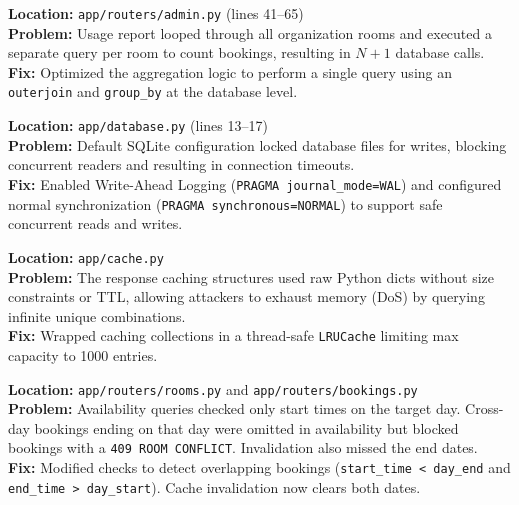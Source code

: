 \documentclass[11pt,a4paper]{article}
\begin{document}
\begin{tcolorbox}[colback=red!5!white,colframe=red!75!black,title=Bug 09: N+1 Database Query Performance in Usage Report]
\textbf{Location:} \texttt{app/routers/admin.py} (lines 41--65)\\
\textbf{Problem:} Usage report looped through all organization rooms and executed a separate query per room to count bookings, resulting in $N+1$ database calls.\\
\textbf{Fix:} Optimized the aggregation logic to perform a single query using an \texttt{outerjoin} and \texttt{group\_by} at the database level.
\end{tcolorbox}

\begin{tcolorbox}[colback=red!5!white,colframe=red!75!black,title=Bug 10: SQLite Default DELETE Journal Mode (Concurrency Bottleneck)]
\textbf{Location:} \texttt{app/database.py} (lines 13--17)\\
\textbf{Problem:} Default SQLite configuration locked database files for writes, blocking concurrent readers and resulting in connection timeouts.\\
\textbf{Fix:} Enabled Write-Ahead Logging (\texttt{PRAGMA journal\_mode=WAL}) and configured normal synchronization (\texttt{PRAGMA synchronous=NORMAL}) to support safe concurrent reads and writes.
\end{tcolorbox}

\begin{tcolorbox}[colback=red!5!white,colframe=red!75!black,title=Bug 11: Unbounded Cache Memory Exhaustion (Cache DoS)]
\textbf{Location:} \texttt{app/cache.py}\\
\textbf{Problem:} The response caching structures used raw Python dicts without size constraints or TTL, allowing attackers to exhaust memory (DoS) by querying infinite unique combinations.\\
\textbf{Fix:} Wrapped caching collections in a thread-safe \texttt{LRUCache} limiting max capacity to 1000 entries.
\end{tcolorbox}

\begin{tcolorbox}[colback=red!5!white,colframe=red!75!black,title=Bug 12: Cross-Day Booking Availability Inconsistency (API Leak)]
\textbf{Location:} \texttt{app/routers/rooms.py} and \texttt{app/routers/bookings.py}\\
\textbf{Problem:} Availability queries checked only start times on the target day. Cross-day bookings ending on that day were omitted in availability but blocked bookings with a \texttt{409 ROOM CONFLICT}. Invalidation also missed the end dates.\\
\textbf{Fix:} Modified checks to detect overlapping bookings (\texttt{start\_time < day\_end} and \texttt{end\_time > day\_start}). Cache invalidation now clears both dates.
\end{tcolorbox}
\end{document}
